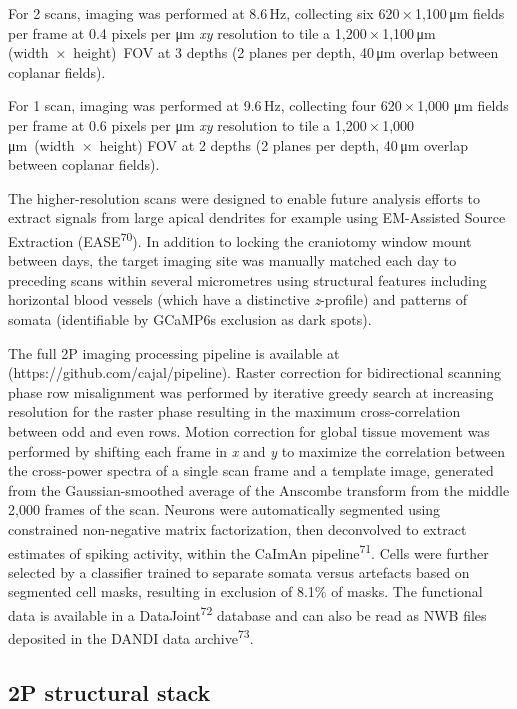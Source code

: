 \documentclass{article}
\begin{document}
For 2 scans, imaging was performed at 8.6\,Hz, collecting six 620\,×\,1,100\,μm fields per frame at 0.4 pixels per μm \emph{xy} resolution to tile a 1,200\,×\,1,100\,μm (width~×~height)~FOV at 3 depths (2 planes per depth, 40\,μm overlap between coplanar fields).

For 1 scan, imaging was performed at 9.6\,Hz, collecting four 620\,×\,1,000 μm fields per frame at 0.6 pixels per μm \emph{xy} resolution to tile a 1,200\,×\,1,000 μm~(width~×~height) FOV at 2 depths (2 planes per depth, 40\,μm overlap between coplanar fields).

The higher-resolution scans were designed to enable future analysis efforts to extract signals from large apical dendrites for example using EM-Assisted Source Extraction (EASE\textsuperscript{70}). In addition to locking the craniotomy window mount between days, the target imaging site was manually matched each day to preceding scans within several micrometres using structural features including horizontal blood vessels (which have a distinctive \emph{z}-profile) and patterns of somata (identifiable by GCaMP6s exclusion as dark spots).

The full 2P imaging processing pipeline is available at (https://github.com/cajal/pipeline). Raster correction for bidirectional scanning phase row misalignment was performed by iterative greedy search at increasing resolution for the raster phase resulting in the maximum cross-correlation between odd and even rows. Motion correction for global tissue movement was performed by shifting each frame in \emph{x} and \emph{y} to maximize the correlation between the cross-power spectra of a single scan frame and a template image, generated from the Gaussian-smoothed average of the Anscombe transform from the middle 2,000 frames of the scan. Neurons were automatically segmented using constrained non-negative matrix factorization, then deconvolved to extract estimates of spiking activity, within the CaImAn pipeline\textsuperscript{71}. Cells were further selected by a classifier trained to separate somata versus artefacts based on segmented cell masks, resulting in exclusion of 8.1\% of masks. The functional data is available in a DataJoint\textsuperscript{72} database and can also be read as NWB files deposited in the DANDI data archive\textsuperscript{73}.

\subsection*{2P structural stack}
\end{document}
